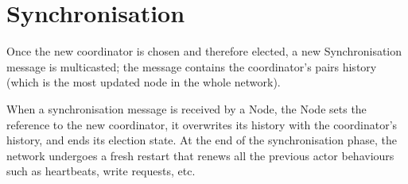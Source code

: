 \section{Synchronisation}
Once the new coordinator is chosen and therefore elected, a new Synchronisation message is multicasted; the message contains the coordinator's pairs history (which is the most updated node in the whole network).

When a synchronisation message is received by a Node, the Node sets the reference to the new coordinator, it overwrites its history with the coordinator's history, and ends its election state. At the end of the synchronisation phase, the network undergoes a fresh restart that renews all the previous actor behaviours such as heartbeats, write requests, etc.